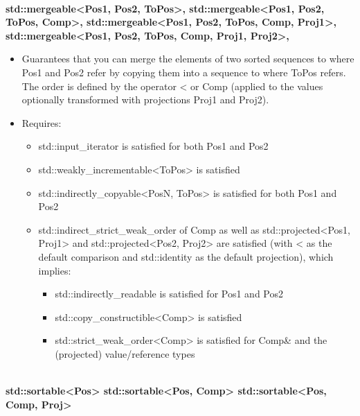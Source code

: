 \noindent
\hspace*{\fill} \\ %
\textbf{std::mergeable<Pos1, Pos2, ToPos>,
std::mergeable<Pos1, Pos2, ToPos, Comp>,
std::mergeable<Pos1, Pos2, ToPos, Comp, Proj1>,
std::mergeable<Pos1, Pos2, ToPos, Comp, Proj1, Proj2>,}

\begin{itemize}
\item
Guarantees that you can merge the elements of two sorted sequences to where Pos1 and Pos2 refer by copying them into a sequence to where ToPos refers. The order is defined by the operator < or Comp (applied to the values optionally transformed with projections Proj1 and Proj2).

\item
Requires:
\begin{itemize}
\item
std::input\_iterator is satisfied for both Pos1 and Pos2

\item
std::weakly\_incrementable<ToPos> is satisfied

\item
std::indirectly\_copyable<PosN, ToPos> is satisfied for both Pos1 and Pos2

\item
std::indirect\_strict\_weak\_order of Comp as well as std::projected<Pos1, Proj1> and std::projected<Pos2, Proj2> are satisfied (with < as the default comparison and std::identity as the default projection), which implies:

\begin{itemize}
\item
std::indirectly\_readable is satisfied for Pos1 and Pos2

\item
std::copy\_constructible<Comp> is satisfied

\item
std::strict\_weak\_order<Comp> is satisfied for Comp\& and the (projected) value/reference types
\end{itemize}
\end{itemize}
\end{itemize}

\noindent
\hspace*{\fill} \\ %
\textbf{std::sortable<Pos>
	std::sortable<Pos, Comp>
	std::sortable<Pos, Comp, Proj>}


